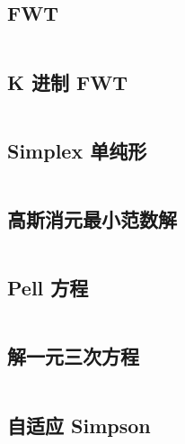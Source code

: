 \documentclass[titlepage, a4paper]{article}
\begin{document}
\begin{multicols}{2}
\begin{spacing}{0.6}
				\subsection{FWT}
					\inputminted{cpp}{src/Math/FWT.cpp}
				\subsection{K 进制 FWT}
					\inputminted{cpp}{src/tbr/fwt.cpp}
				\subsection{Simplex 单纯形}
					\inputminted{cpp}{src/Math/Simplex.cpp}
				\subsection{高斯消元最小范数解}
					\inputminted{cpp}{src/Geometry/minnorm_gauss.cpp}
				\subsection{Pell 方程}
					\inputminted{cpp}{src/Math/Pell方程.cpp}
				\subsection{解一元三次方程}
					\inputminted{cpp}{src/Math/解一元三次方程.cpp}
				\subsection{自适应 Simpson}
					\inputminted{cpp}{src/Math/Simpson.cpp}
		

\end{spacing}
\end{multicols}
\end{document}
